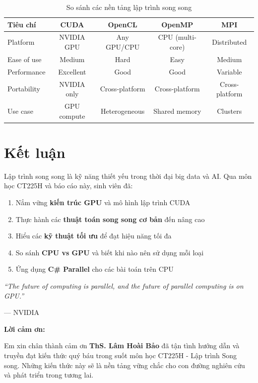 \begin{table}[H]
\centering
\caption{So sánh các nền tảng lập trình song song}
\label{tab:platforms_comparison}
\begin{tabular}{@{}lcccc@{}}
\toprule
\textbf{Tiêu chí} & \textbf{CUDA} & \textbf{OpenCL} & \textbf{OpenMP} & \textbf{MPI} \\
\midrule
Platform & NVIDIA GPU & Any GPU/CPU & CPU (multi-core) & Distributed \\
Ease of use & Medium & Hard & Easy & Medium \\
Performance & Excellent & Good & Good & Variable \\
Portability & NVIDIA only & Cross-platform & Cross-platform & Cross-platform \\
Use case & GPU compute & Heterogeneous & Shared memory & Clusters \\
\bottomrule
\end{tabular}
\end{table}

\section{Kết luận}

Lập trình song song là kỹ năng thiết yếu trong thời đại big data và AI. Qua môn học CT225H và báo cáo này, sinh viên đã:

\begin{enumerate}
    \item Nắm vững \textbf{kiến trúc GPU} và mô hình lập trình CUDA
    \item Thực hành các \textbf{thuật toán song song cơ bản} đến nâng cao
    \item Hiểu các \textbf{kỹ thuật tối ưu} để đạt hiệu năng tối đa
    \item So sánh \textbf{CPU vs GPU} và biết khi nào nên sử dụng mỗi loại
    \item Ứng dụng \textbf{C\# Parallel} cho các bài toán trên CPU
\end{enumerate}

\vspace{1cm}

\begin{center}
\textit{``The future of computing is parallel, and the future of parallel computing is on GPU.''}

\vspace{0.5cm}
--- NVIDIA
\end{center}

\vspace{1cm}

\noindent\textbf{Lời cảm ơn:}

Em xin chân thành cảm ơn \textbf{ThS. Lâm Hoài Bảo} đã tận tình hướng dẫn và truyền đạt kiến thức quý báu trong suốt môn học CT225H - Lập trình Song song. Những kiến thức này sẽ là nền tảng vững chắc cho con đường nghiên cứu và phát triển trong tương lai.
